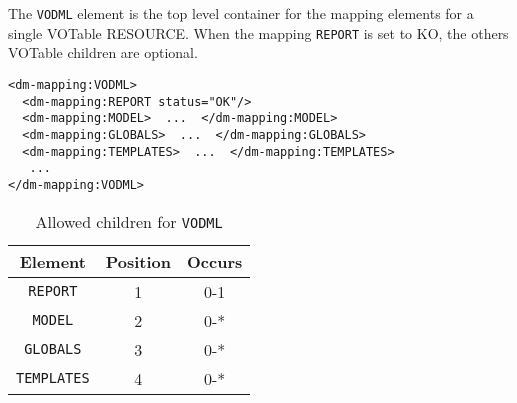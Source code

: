 The \texttt{VODML} element is the top level container for the mapping elements for a single VOTable RESOURCE.
When the mapping \texttt{REPORT} is set to KO, the others  VOTable children are optional.

\begin{lstlisting}[frame=single,caption={Example \texttt{VODML} mapping block},style=XML,basicstyle=\tiny]
<dm-mapping:VODML>
  <dm-mapping:REPORT status="OK"/>
  <dm-mapping:MODEL>  ...  </dm-mapping:MODEL>
  <dm-mapping:GLOBALS>  ...  </dm-mapping:GLOBALS>
  <dm-mapping:TEMPLATES>  ...  </dm-mapping:TEMPLATES>
   ...
</dm-mapping:VODML>
\end{lstlisting}

\begin{table}[!htbp]
  \small
  \centering
  \begin{tabulary}{\linewidth}{|c |c |c|}
    \hline 
        \textbf{Element} &
        \textbf{Position} &
        \textbf{Occurs}\\
    \hline
    \hline  
      \texttt{REPORT} &           
      1 &           
      0-1\\
    \hline  
      \texttt{MODEL} &           
      2 &           
      0-*\\
    \hline    
      \texttt{GLOBALS} &           
      3 &           
      0-*\\
    \hline  
      \texttt{TEMPLATES} &           
      4 &           
      0-*\\
    \hline 
  \end{tabulary}
    \caption{Allowed children for \texttt{VODML}} 
    \label{tbl:vodml-children}
\end{table}


